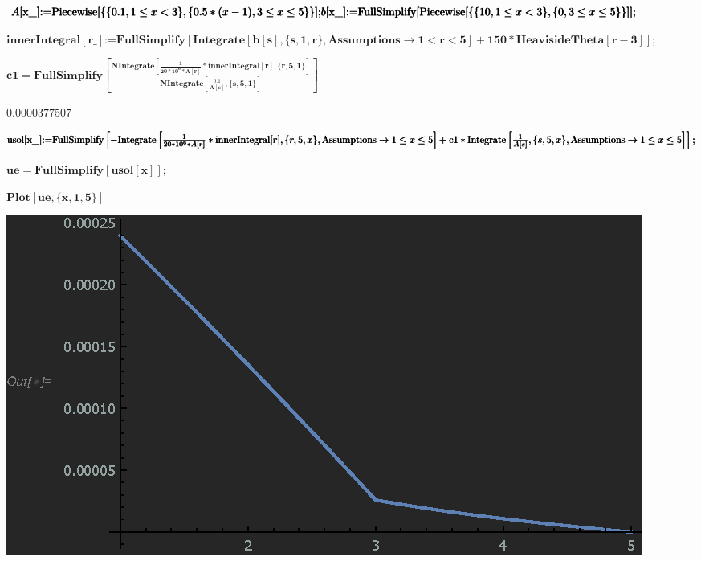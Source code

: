 \documentclass{article}
\begin{document}
\sffamily
\begin{doublespace}
\noindent\(\pmb{A[\text{x$\_$}]\text{:=}\text{Piecewise}[\{\{0.1, 1\leq x<3\}, \{0.5*(x-1),3\leq x\leq 5\}\}];}\\
\pmb{b[\text{x$\_$}]\text{:=}\text{FullSimplify}[\text{Piecewise}[\{\{10, 1\leq x<3\}, \{0,3\leq x\leq 5\}\}] ];}\)
\end{doublespace}

\begin{doublespace}
\noindent\(\pmb{\text{innerIntegral}[\text{r$\_$}]\text{:=} \text{FullSimplify}[\text{Integrate}[b[s],\{s,1,r\},\text{Assumptions}\to 1<r<5]+150*\text{HeavisideTheta}[r-3]];}\)
\end{doublespace}

\begin{doublespace}
\noindent\(\pmb{\text{c1} =\text{FullSimplify}\left[ \frac{\text{NIntegrate}\left[\frac{1}{20*10^6*A[r]}*\text{innerIntegral}[r],\{r,5,1\}\right]}{\text{NIntegrate}\left[\frac{0.1}{A[s]},\{s,5,1\}\right]}\right]}\)
\end{doublespace}

\begin{doublespace}
\noindent\(0.0000377507\)
\end{doublespace}

\begin{doublespace}
\noindent\(\pmb{\text{usol}[\text{x$\_$}]\text{:=}\text{FullSimplify}\left[-\text{Integrate}\left[\frac{1}{20*10^6*A[r]}*\text{innerIntegral}[r],\{r,5,x\},\text{Assumptions}\to
1\leq x\leq 5\right]+\right.}\\
\pmb{\left.\text{c1}*\text{Integrate}\left[\frac{1}{A[s]},\{s,5,x\},\text{Assumptions}\to 1\leq x\leq 5\right]\right];}\)
\end{doublespace}

\begin{doublespace}
\noindent\(\pmb{\text{ue} = \text{FullSimplify}[\text{usol}[x]];}\)
\end{doublespace}

\begin{doublespace}
\noindent\(\pmb{\text{Plot}[\text{ue},\{x,1,5\}]}\)
\end{doublespace}

\includegraphics{AnalyticalHW4_gr1.eps}
\end{document}
